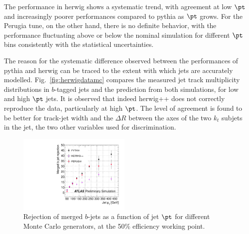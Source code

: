 
The performance in {\sc herwig} shows a systematic trend, with agreement at low $\pt$ and increasingly poorer performances compared to {\sc pythia} as $\pt$ grows. For the Perugia tune, on the other hand, there is no definite behavior, with the performance fluctuating above or below the nominal simulation for different $\pt$ bins consistently with the statistical uncertainties.

The reason for the systematic difference observed between the performances of {\sc pythia} and {\sc herwig} can be traced to the extent with which jets are accurately modelled. Fig.~\ref{fig:herwigdatamc} compares the measured jet track multiplicity distributions in $b$-tagged jets and the prediction from both simulations, for low and high $\pt$ jets. It is observed that indeed {\sc herwig++} does not correctly reproduce the data, particularly at high $\pt$. The level of agreement is found to be better for track-jet width and the $\Delta R$ between the axes of the two $k_t$ subjets in the jet, the two other variables used for discrimination.






\begin{figure}[tp]
\centering
\includegraphics[width=0.49\textwidth]{gbbRejection_vs_PT_3MonteCarlos_50Eff.pdf}
\caption{Rejection of merged $b$-jets as a function of jet $\pt$ for different Monte Carlo generators, at the 50\% efficiency working point.}
\label{fig:performanceotherMC}
\end{figure}

